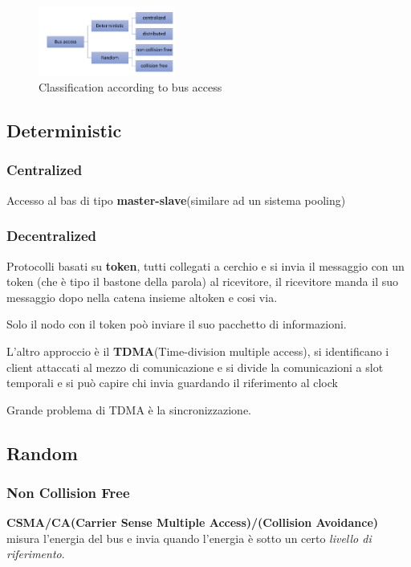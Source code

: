 \begin{figure}[!ht]
  \centering
  \includegraphics[width=0.4\textwidth]{./images/classification_bus_access.png}
  \caption{Classification according to bus access}
  \label{fig:classification_bus_access}
\end{figure}

\subsection{Deterministic}
\subsubsection{Centralized}
Accesso al bas di tipo \textbf{master-slave}(similare ad un sistema pooling)
\subsubsection{Decentralized}

Protocolli basati su \textbf{token}, tutti collegati a cerchio e si invia il messaggio con un token (che è tipo il bastone della parola) al ricevitore, il ricevitore manda il suo messaggio dopo nella catena insieme altoken e cosi via.

Solo il nodo con il token poò inviare il suo pacchetto di informazioni.


L'altro approccio è il \textbf{TDMA}(Time-division multiple access), si identificano i client attaccati al mezzo di comunicazione e si divide la comunicazioni a slot temporali e si può capire chi invia guardando il riferimento al clock

Grande problema di TDMA è la sincronizzazione.


\subsection{Random}
\subsubsection{Non Collision Free}
\textbf{CSMA/CA(Carrier Sense Multiple Access)/(Collision Avoidance)} misura l'energia del bus e invia quando l'energia è sotto un certo \textit{livello di riferimento}.

